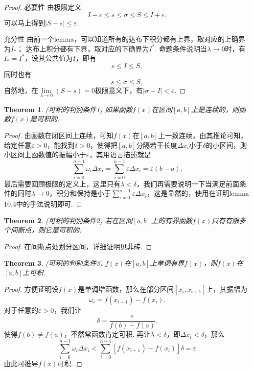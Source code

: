 \documentclass{article}
\newtheorem{theorem}{Theorem}[section]
\begin{document}
\begin{proof}
{\color{blue} 必要性} 由极限定义
$$
I-\varepsilon \leq s \leq \sigma \leq S \leq I+\varepsilon.
$$
可以马上得到$|S-s| \leq \varepsilon$.

{\color{blue} 充分性} 由前一个lemma，可以知道所有的达布下积分都有上界，取对应的上确界为$I_*$； 达布上积分都有下界，取对应的下确界为$I^*$. 命题条件说明当$\lambda \rightarrow 0$时，有$I_* = I^*$，设其公共值为$I$，即有
$$
s \leq I \leq S,
$$
同时也有
$$
s \leq \sigma \leq S,
$$
自然地，在$\lim\limits_{\lambda \rightarrow 0} (S-s) = 0$极限意义下，有$|\sigma -I| < \varepsilon$.
\end{proof}


\begin{theorem}
\rm {\color{red} (可积的判别条件1) }如果函数$f(x)$在区间$[a,b]$上是连续的，则函数$f(x)$是可积的.
\end{theorem}

\begin{proof}
由函数在闭区间上连续，可知$f(x)$在$[a,b]$上一致连续，由其推论可知，给定任意$\varepsilon > 0$，能找到$\delta > 0$，使得把$[a,b]$分隔若干长度$\Delta x_i$小于$\delta$的小区间，则小区间上函数值的振幅小于$\varepsilon$，其用语言描述就是
$$
\sum\limits_{i=0}^{n-1} \omega_i \Delta x_i =  \sum\limits_{i=0}^{n-1} \varepsilon \Delta x_i = \varepsilon(b-a).
$$
最后需要回顾极限的定义上，这里只有$\lambda < \delta$，我们再需要说明一下当满足前面条件的同时$\lambda \rightarrow 0$，积分和保持是小于$\sum\limits_{i=0}^{n-1} \varepsilon \Delta x_i$，这是显然的，使用在证明lemma 10.4中的手法说明即可.
\end{proof}

\begin{theorem}
\rm {\color{red} (可积的判别条件2) } 若在区间$[a,b]$上的有界函数$f(x)$只有有限多个间断点，则它是可积的.
\end{theorem}

\begin{proof}
在间断点处划分区间，详细证明见菲砖.
\end{proof}

\begin{theorem}
\rm {\color{red} (可积的判别条件3) } $f(x)$在$[a,b]$上单调有界$f(x)$，则$f(x)$在$[a,b]$上可积. 
\end{theorem}

\begin{proof}
方便证明设$f(x)$是单调增函数，那么在部分区间$[x_i,x_{i+1}]$上，其振幅为
$$
\omega_i = f(x_{i+1})-f(x_{i}).
$$
对于任意的$\varepsilon > 0$，我们让
$$
\delta = \frac{\varepsilon}{f(b)-f(a)}.
$$
使得$f(b)\neq f(a)$，不然常函数肯定可积. 再让$\lambda < \delta$，即$\Delta x_i < \delta$，那么
$$
\sum\limits_{i=0}^{n-1}\omega_i\Delta x_i < \sum\limits_{i=0}^{n-1}\left[f(x_{i+1})-f(x_{i})\right] \delta = \varepsilon 
$$
由此可推导$f(x)$可积.
\end{proof}
\end{document}
